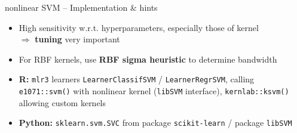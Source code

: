 \begin{frame2}{nonlinear SVM -- Implementation \& hints}







\begin{itemize}
\item High sensitivity w.r.t. hyperparameters, especially those of kernel
\\ $\Rightarrow$ \textbf{tuning} very important
\item For RBF kernels, use \textbf{RBF sigma heuristic} to determine 
bandwidth
\end{itemize}

\medskip
{} 
\begin{itemize}
\item \textbf{R:} \texttt{mlr3} learners \texttt{LearnerClassifSVM} /
\texttt{LearnerRegrSVM}, calling \texttt{e1071::svm()} with nonlinear kernel (\texttt{libSVM} interface),
\texttt{kernlab::ksvm()} allowing custom kernels
\item \textbf{Python:} \texttt{sklearn.svm.SVC} from package 
\texttt{scikit-learn} / package \texttt{libSVM}
\end{itemize}

\end{frame2}

